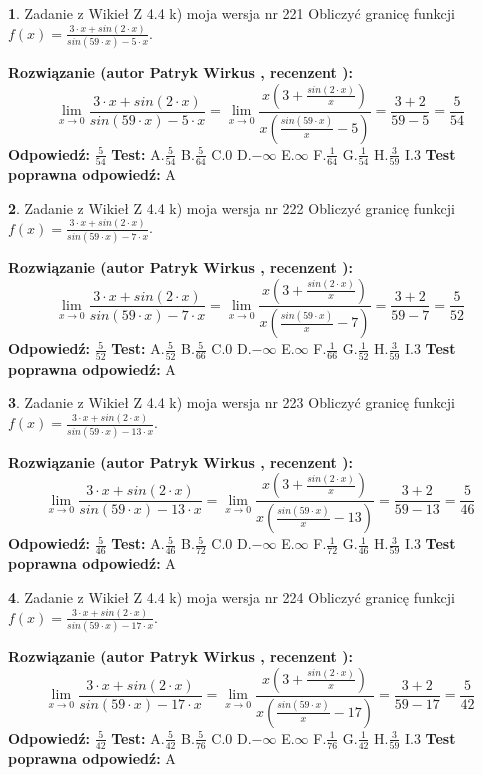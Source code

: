 \documentclass[12pt, a4paper]{article}
\theoremstyle{definition} %
\newtheorem{zad}{}
\newcommand{\zadStart}[1]{\begin{zad}#1\newline}
\newcommand{\zadStop}{\end{zad}}
\newcommand{\rozwStart}[2]{\noindent \textbf{Rozwiązanie (autor #1 , recenzent #2): }\newline}
\newcommand{\rozwStop}{\newline}
\newcommand{\odpStart}{\noindent \textbf{Odpowiedź:}\newline}
\newcommand{\odpStop}{\newline}
\newcommand{\testStart}{\noindent \textbf{Test:}\newline}
\newcommand{\testStop}{\newline}
\newcommand{\kluczStart}{\noindent \textbf{Test poprawna odpowiedź:}\newline}
\newcommand{\kluczStop}{\newline}
\begin{document}
\zadStart{Zadanie z Wikieł Z 4.4 k) moja wersja nr 221}
Obliczyć granicę funkcji $f(x)=\frac{3\cdot x +sin(2\cdot x)}{sin(59\cdot x) -5\cdot x}$.
\zadStop
\rozwStart{Patryk Wirkus}{}
$$\lim\limits_{x\to 0}\frac{3\cdot x +sin(2\cdot x)}{sin(59\cdot x) -5\cdot x}
=\lim\limits_{x\to 0}\frac{x(3+\frac{sin(2\cdot x)}{x})}{x(\frac{sin(59\cdot x)}{x}-5)}
=\frac{3+2}{59-5} = \frac{5}{54}$$
\rozwStop
\odpStart
$\frac{5}{54}$
\odpStop
\testStart
A.$\frac{5}{54}$
B.$\frac{5}{64}$
C.$0$
D.$-\infty$
E.$\infty$
F.$\frac{1}{64}$
G.$\frac{1}{54}$
H.$\frac{3}{59}$
I.$3$
\testStop
\kluczStart
A
\kluczStop



\zadStart{Zadanie z Wikieł Z 4.4 k) moja wersja nr 222}
Obliczyć granicę funkcji $f(x)=\frac{3\cdot x +sin(2\cdot x)}{sin(59\cdot x) -7\cdot x}$.
\zadStop
\rozwStart{Patryk Wirkus}{}
$$\lim\limits_{x\to 0}\frac{3\cdot x +sin(2\cdot x)}{sin(59\cdot x) -7\cdot x}
=\lim\limits_{x\to 0}\frac{x(3+\frac{sin(2\cdot x)}{x})}{x(\frac{sin(59\cdot x)}{x}-7)}
=\frac{3+2}{59-7} = \frac{5}{52}$$
\rozwStop
\odpStart
$\frac{5}{52}$
\odpStop
\testStart
A.$\frac{5}{52}$
B.$\frac{5}{66}$
C.$0$
D.$-\infty$
E.$\infty$
F.$\frac{1}{66}$
G.$\frac{1}{52}$
H.$\frac{3}{59}$
I.$3$
\testStop
\kluczStart
A
\kluczStop



\zadStart{Zadanie z Wikieł Z 4.4 k) moja wersja nr 223}
Obliczyć granicę funkcji $f(x)=\frac{3\cdot x +sin(2\cdot x)}{sin(59\cdot x) -13\cdot x}$.
\zadStop
\rozwStart{Patryk Wirkus}{}
$$\lim\limits_{x\to 0}\frac{3\cdot x +sin(2\cdot x)}{sin(59\cdot x) -13\cdot x}
=\lim\limits_{x\to 0}\frac{x(3+\frac{sin(2\cdot x)}{x})}{x(\frac{sin(59\cdot x)}{x}-13)}
=\frac{3+2}{59-13} = \frac{5}{46}$$
\rozwStop
\odpStart
$\frac{5}{46}$
\odpStop
\testStart
A.$\frac{5}{46}$
B.$\frac{5}{72}$
C.$0$
D.$-\infty$
E.$\infty$
F.$\frac{1}{72}$
G.$\frac{1}{46}$
H.$\frac{3}{59}$
I.$3$
\testStop
\kluczStart
A
\kluczStop



\zadStart{Zadanie z Wikieł Z 4.4 k) moja wersja nr 224}
Obliczyć granicę funkcji $f(x)=\frac{3\cdot x +sin(2\cdot x)}{sin(59\cdot x) -17\cdot x}$.
\zadStop
\rozwStart{Patryk Wirkus}{}
$$\lim\limits_{x\to 0}\frac{3\cdot x +sin(2\cdot x)}{sin(59\cdot x) -17\cdot x}
=\lim\limits_{x\to 0}\frac{x(3+\frac{sin(2\cdot x)}{x})}{x(\frac{sin(59\cdot x)}{x}-17)}
=\frac{3+2}{59-17} = \frac{5}{42}$$
\rozwStop
\odpStart
$\frac{5}{42}$
\odpStop
\testStart
A.$\frac{5}{42}$
B.$\frac{5}{76}$
C.$0$
D.$-\infty$
E.$\infty$
F.$\frac{1}{76}$
G.$\frac{1}{42}$
H.$\frac{3}{59}$
I.$3$
\testStop
\kluczStart
A
\kluczStop
\end{document}
